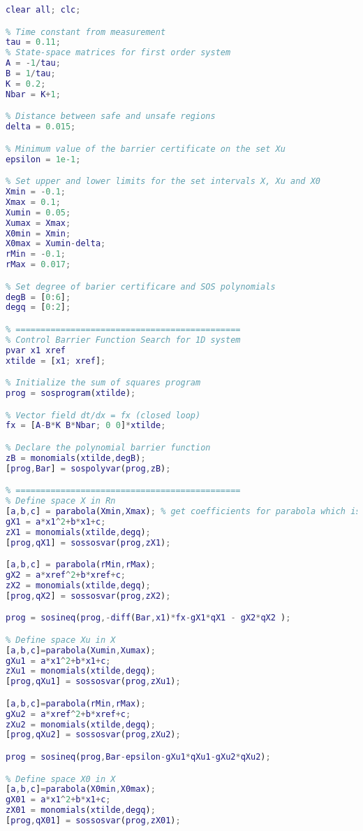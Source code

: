 \begin{lstlisting}[language=matlab]
% 1D system WITH REFERENCE INTERVAL
clear all; clc; 

% Time constant from measurement
tau = 0.11;
% State-space matrices for first order system
A = -1/tau;
B = 1/tau;
K = 0.2;
Nbar = K+1;

% Distance between safe and unsafe regions
delta = 0.015;

% Minimum value of the barrier certificate on the set Xu
epsilon = 1e-1;

% Set upper and lower limits for the set intervals X, Xu and X0
Xmin = -0.1;
Xmax = 0.1;
Xumin = 0.05;
Xumax = Xmax;
X0min = Xmin;
X0max = Xumin-delta;
rMin = -0.1;
rMax = 0.017;

% Set degree of barier certificare and SOS polynomials
degB = [0:6];
degq = [0:2];

% =============================================
% Control Barrier Function Search for 1D system
pvar x1 xref
xtilde = [x1; xref];

% Initialize the sum of squares program
prog = sosprogram(xtilde);

% Vector field dt/dx = fx (closed loop)
fx = [A-B*K B*Nbar; 0 0]*xtilde;

% Declare the polynomial barrier function
zB = monomials(xtilde,degB);
[prog,Bar] = sospolyvar(prog,zB);

% =============================================
% Define space X in Rn
[a,b,c] = parabola(Xmin,Xmax); % get coefficients for parabola which is positive for x in [-0.1,0.1]
gX1 = a*x1^2+b*x1+c;
zX1 = monomials(xtilde,degq);
[prog,qX1] = sossosvar(prog,zX1);

[a,b,c] = parabola(rMin,rMax); 
gX2 = a*xref^2+b*xref+c;
zX2 = monomials(xtilde,degq);
[prog,qX2] = sossosvar(prog,zX2);

prog = sosineq(prog,-diff(Bar,x1)*fx-gX1*qX1 - gX2*qX2 );

% Define space Xu in X
[a,b,c]=parabola(Xumin,Xumax);
gXu1 = a*x1^2+b*x1+c;
zXu1 = monomials(xtilde,degq);
[prog,qXu1] = sossosvar(prog,zXu1);

[a,b,c]=parabola(rMin,rMax);
gXu2 = a*xref^2+b*xref+c;
zXu2 = monomials(xtilde,degq);
[prog,qXu2] = sossosvar(prog,zXu2);

prog = sosineq(prog,Bar-epsilon-gXu1*qXu1-gXu2*qXu2);

% Define space X0 in X
[a,b,c]=parabola(X0min,X0max);
gX01 = a*x1^2+b*x1+c;
zX01 = monomials(xtilde,degq);
[prog,qX01] = sossosvar(prog,zX01);


\end{lstlisting}
